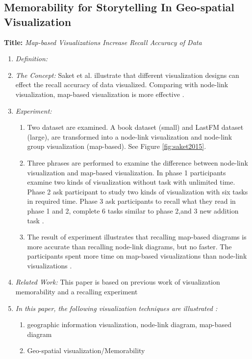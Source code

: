 \documentclass{egpubl}
\begin{document}
\subsection{Memorability for Storytelling In Geo-spatial Visualization}
\textbf{Title:} \textit{Map-based Visualizations Increase Recall Accuracy of Data}
\begin{enumerate}
\item \textit{Definition:}  
\item \textit{The Concept:} Saket et al. illustrate that different visualization designs can effect the recall accuracy of data visualized. Comparing with node-link visualization, map-based visualization is more effective \cite{saket2015}.
\item  \textit{Experiment:} 
\begin{enumerate}
\item Two dataset are examined. A book dataset (small) and LastFM dataset (large), are transformed into a node-link visualization and node-link group visualization (map-based). See Figure \ref{fig:saket2015}.
\item Three phrases are performed to examine the difference between node-link visualization and map-based visualization. In phase 1 participants examine two kinds of visualization without task with unlimited time. Phase 2 ask participant to study two kinds of visualization with six tasks in required time. Phase 3 ask participants to recall what they read in phase 1 and 2, complete 6 tasks similar to phase 2,and 3 new addition task \cite{saket2015}.
\item The result of experiment illustrates that recalling map-based diagrams is more accurate than recalling node-link diagrams, but no faster.
The participants spent more time on map-based visualizations than node-link visualizations \cite{saket2015}.  
\end{enumerate}
\item \textit{Related Work:} This paper is based on previous work of visualization memorability \cite{bateman} and a recalling experiment \cite{isola2011}
\item \textit{In this paper, the following visualization techniques are illustrated :} 
\begin{enumerate}
\item geographic information visualization, node-link diagram, map-based diagram
\item Geo-spatial visualization/Memorability
\end{enumerate}
\end{enumerate}
\end{document}
